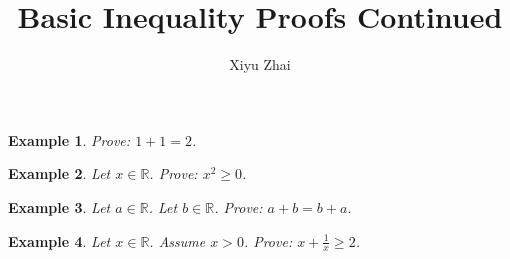 \documentclass{article}
\newtheorem{example}{Example}
\begin{document}
\title{Basic Inequality Proofs Continued}
\author{Xiyu Zhai}
\maketitle

\begin{example}
    Prove: $1+1=2$.
\end{example}


\begin{example}
    Let $x\in\mathbb{R}$. Prove: $x^2\ge 0$.
\end{example}

\begin{example}
    Let $a\in\mathbb{R}$. Let $b\in\mathbb{R}$. Prove: $a+b=b+a$.
\end{example}

\begin{example}
    Let $x\in\mathbb{R}$. Assume $x> 0$. Prove: $x + \frac{1}{x} \ge 2$.
\end{example}
\end{document}
